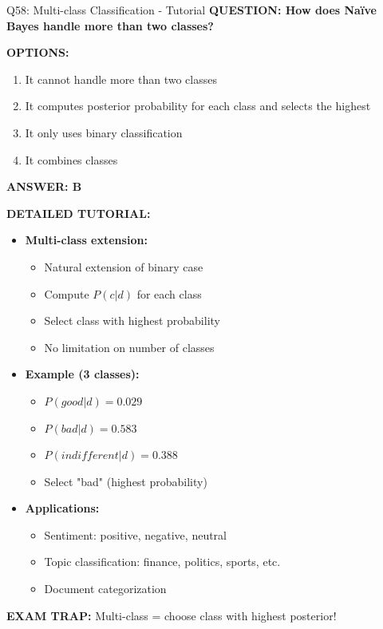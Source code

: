 \documentclass[8pt]{beamer}
\begin{document}
	\begin{frame}{Q58: Multi-class Classification - Tutorial}
		\fontsize{6.5}{7.5}\selectfont
		\textbf{QUESTION: How does Naïve Bayes handle more than two classes?}
		
		\vspace{0.1cm}
		\textbf{OPTIONS:}
		\begin{enumerate}
			\item It cannot handle more than two classes
			\item It computes posterior probability for each class and selects the highest
			\item It only uses binary classification
			\item It combines classes
		\end{enumerate}
		
		\vspace{0.1cm}
		\textcolor{myblue}{\textbf{ANSWER: B}}
		
		\vspace{0.1cm}
		\textbf{DETAILED TUTORIAL:}
		\begin{itemize}
			\item \textbf{Multi-class extension:}
			\begin{itemize}
				\item Natural extension of binary case
				\item Compute $P(c|d)$ for each class
				\item Select class with highest probability
				\item No limitation on number of classes
			\end{itemize}
			\item \textbf{Example (3 classes):}
			\begin{itemize}
				\item $P(good|d) = 0.029$
				\item $P(bad|d) = 0.583$
				\item $P(indifferent|d) = 0.388$
				\item Select "bad" (highest probability)
			\end{itemize}
			\item \textbf{Applications:}
			\begin{itemize}
				\item Sentiment: positive, negative, neutral
				\item Topic classification: finance, politics, sports, etc.
				\item Document categorization
			\end{itemize}
		\end{itemize}
		
		\textcolor{myred}{\textbf{EXAM TRAP:}} Multi-class = \textcolor{myblue}{choose class with highest posterior}!
	\end{frame}
	
\end{document}

